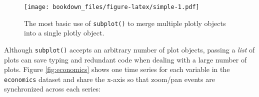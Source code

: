 \documentclass[12pt,]{isuthesis}
\newenvironment{Shaded}{\begin{snugshade}}{\end{snugshade}}
\newcommand{\KeywordTok}[1]{\textcolor[rgb]{0.13,0.29,0.53}{\textbf{{#1}}}}
\newcommand{\DataTypeTok}[1]{\textcolor[rgb]{0.13,0.29,0.53}{{#1}}}
\newcommand{\StringTok}[1]{\textcolor[rgb]{0.31,0.60,0.02}{{#1}}}
\newcommand{\OtherTok}[1]{\textcolor[rgb]{0.56,0.35,0.01}{{#1}}}
\newcommand{\NormalTok}[1]{{#1}}
\begin{document}
\begin{Shaded}
\end{Shaded}

\begin{figure}[htbp]
\centering
\texttt{[image: bookdown\_files/figure-latex/simple-1.pdf]}
\caption{\label{fig:simple}The most basic use of \texttt{subplot()} to merge
multiple plotly objects into a single plotly object.}
\end{figure}

Although \texttt{subplot()} accepts an arbitrary number of plot objects,
passing a \emph{list} of plots can save typing and redundant code when
dealing with a large number of plots. Figure \ref{fig:economics} shows
one time series for each variable in the \texttt{economics} dataset and
share the x-axis so that zoom/pan events are synchronized across each
series:

\begin{Shaded}
\end{Shaded}
\end{document}
